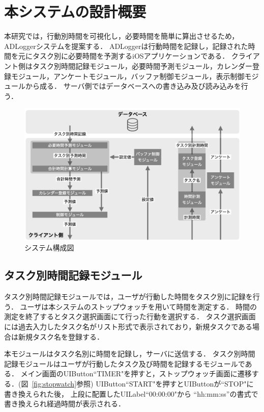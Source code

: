 \section{本システムの設計概要}
本研究では，行動別時間を可視化し，必要時間を簡単に算出させるため，ADLoggerシステムを提案する．
ADLoggerは行動時間を記録し，記録された時間を元にタスク別に必要時間を予測するiOSアプリケーションである．
クライアント側はタスク別時間記録モジュール，必要時間予測モジュール，カレンダー登録モジュール，アンケートモジュール，バッファ制御モジュール，表示制御モジュールから成る．
サーバ側ではデータベースへの書き込み及び読み込みを行う．

\begin{figure}[tb]
	\begin{center}
	\includegraphics[width=16cm]{images/5/3.png}
	\end{center}
	\caption{システム構成図}
	\label{fig:system}
\end{figure}

\subsection{タスク別時間記録モジュール}
タスク別時間記録モジュールでは，ユーザが行動した時間をタスク別に記録を行う．
ユーザは本システムのストップウォッチを用いて時間を測定する．
時間の測定を終了するとタスク選択画面にて行った行動を選択する．
タスク選択画面には過去入力したタスク名がリスト形式で表示されており，新規タスクである場合は新規タスク名を登録する．

本モジュールはタスク名別に時間を記録し，サーバに送信する．
タスク別時間記録モジュールはユーザが行動したタスク及び時間を記録するモジュールである．
メイン画面のUIButton``TIMER"を押すと，ストップウォッチ画面に遷移する．(図~\ref{fig:stopwatch}参照)
UIButton``START"を押すとUIButtonが``STOP"に書き換えられた後，
上段に配置したUILabel``00:00:00"から “hh:mm:ss”の書式で書き換えられ経過時間が表示される．

